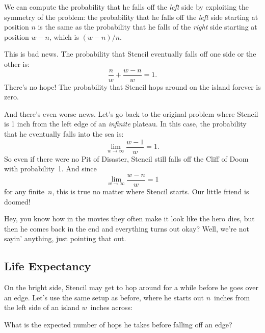 We can compute the probability that he falls off the \emph{left} side
by exploiting the symmetry of the problem: the probability that he
falls off the \emph{left} side starting at position $n$ is the same as
the probability that he falls of the \emph{right} side starting at
position $w - n$, which is $(w - n) / n$.

This is bad news.  The probability that Stencil eventually falls off
one side or the other is:
%
\[
    \frac{n}{w} + \frac{w - n}{w} = 1.
\]
%
There's no hope!  The probability that Stencil hops around on the
island forever is zero.

And there's even worse news.  Let's go back to the original problem
where Stencil is 1 inch from the left edge of an \emph{infinite}
plateau.  In this case, the probability that he eventually falls into
the sea is:
%
\[
    \lim_{w \to \infty} \frac{w - 1}{w} = 1.
\]
So even if there were no Pit of Disaster, Stencil still falls off the
Cliff of Doom with probability~1.  And since
\begin{equation*}
    \lim_{w \to \infty} \frac{w - n }{w} = 1
\end{equation*}
for any finite~$n$, this is true no matter where Stencil starts.  Our
little friend is doomed!

Hey, you know how in the movies they often make it look like the hero
dies, but then he comes back in the end and everything turns out okay?
Well, we're not sayin' anything, just pointing that out.

\subsection{Life Expectancy}\label{sec:life_expectancy}

On the bright side, Stencil may get to hop around for a while before
he goes over an edge.  Let's use the same setup as before, where he
starts out $n$~inches from the left side of an island $w$~inches
across:
%
\begin{figure}[h]
\end{figure}
%
What is the expected number of hops he takes before falling off an
edge?

